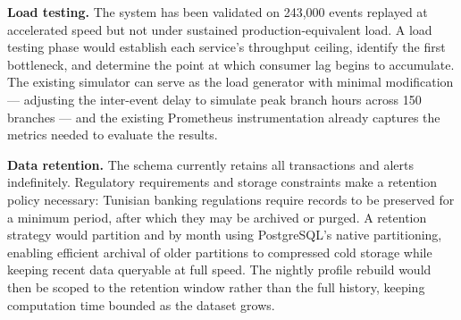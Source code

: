\textbf{Load testing.} The system has been validated on 243{,}000 events replayed at accelerated speed but not under sustained production-equivalent load. A load testing phase would establish each service's throughput ceiling, identify the first bottleneck, and determine the point at which consumer lag begins to accumulate. The existing simulator can serve as the load generator with minimal modification --- adjusting the inter-event delay to simulate peak branch hours across 150 branches --- and the existing Prometheus instrumentation already captures the metrics needed to evaluate the results.

\textbf{Data retention.} The schema currently retains all transactions and alerts indefinitely. Regulatory requirements and storage constraints make a retention policy necessary: Tunisian banking regulations require records to be preserved for a minimum period, after which they may be archived or purged. A retention strategy would partition  and  by month using PostgreSQL's native partitioning, enabling efficient archival of older partitions to compressed cold storage while keeping recent data queryable at full speed. The nightly profile rebuild would then be scoped to the retention window rather than the full history, keeping computation time bounded as the dataset grows.
